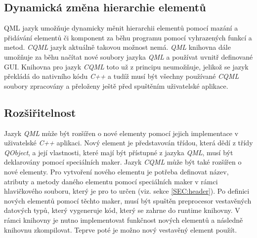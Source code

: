 \documentclass[11pt,twoside,a4paper]{book}
\begin{document}
\subsection{Dynamická změna hierarchie elementů}
QML jazyk umožňuje dynamicky měnit hierarchii elementů pomocí mazání a přidávání elementů či komponent za běhu programu pomocí vyhrazených funkcí a metod. \textit{CQML} jazyk aktuálně takovou možnost nemá. \textit{QML} knihovna dále umožňuje za běhu načítat nové soubory jazyka \textit{QML} a používat uvnitř definované GUI. Knihovna pro jazyk \textit{CQML} toto už z principu neumožňuje, jelikož se jazyk překládá do nativního kódu \textit{C++} a tudíž musí být všechny používané \textit{CQML} soubory zpracovány a přeloženy ještě před spuštěním uživatelské aplikace.
\subsection{Rozšiřitelnost}
Jazyk \textit{QML} může být rozšířen o nové elementy pomocí jejich implementace v uživatelské \textit{C++} aplikaci. Nový element je představován třídou, která dědí z třídy \textit{QObject}, a její vlastnosti, které mají být přístupné z jazyka \textit{QML}, musí být deklarovány pomocí speciálních maker. 
Jazyk \textit{CQML} může být také rozšířen o nové elementy. Pro vytvoření nového elementu je potřeba definovat název, atributy a metody daného elementu pomocí speciálních maker v rámci hlavičkového souboru, který je pro to určen (viz. sekce \ref{SEC:header}). Po definici nových elementů pomocí těchto maker, musí být spuštěn preprocesor vestavěných datových typů, který vygeneruje kód, který se zahrne do runtime knihovny. V rámci knihovny je nutno implementovat funkčnost nových elementů a následně knihovnu zkompilovat. Teprve poté je možno nový vestavěný element použít.
\end{document}
